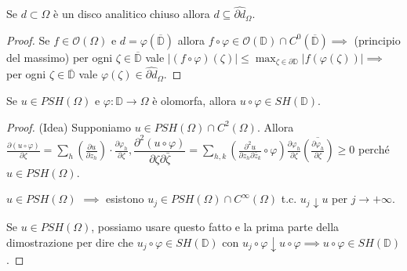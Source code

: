 \begin{lm}
  Se $d \subset \Omega$ è un disco analitico chiuso allora $d \subseteq \widehat{\partial d}_{\Omega}$.
\end{lm}

\begin{proof}
  Se $f \in \mathcal{O}(\Omega)$ e $d=\varphi(\overline{\mathbb{D}})$ allora $f \circ \varphi \in \mathcal{O}(\mathbb{D}) \cap C^0(\overline{\mathbb{D}}) \implies$ (principio del massimo) per ogni $\zeta \in \overline{\mathbb{D}}$ vale $\displaystyle |(f\circ \varphi)(\zeta)| \le \max_{\zeta \in \partial\mathbb{D}} |f(\varphi(\zeta))| \implies$
  per ogni $\zeta \in \overline{\mathbb{D}}$ vale $\varphi(\zeta) \in \widehat{\partial d}_{\Omega}$.
\end{proof}

\begin{lm} \label{uphish}
  Se $u \in PSH(\Omega)$ e $\varphi:\mathbb{D} \longrightarrow \Omega$ è olomorfa, allora $u \circ \varphi \in SH(\mathbb{D})$.
\end{lm}

\begin{proof}
  (Idea) Supponiamo $u \in PSH(\Omega)\cap C^2(\Omega)$.
  Allora $\displaystyle \frac{\partial(u\circ\varphi)}{\partial\zeta}=\sum_h \left(\frac{\partial u}{\partial z_h}\right)\cdot\frac{\partial\varphi_h}{\partial\zeta}, \dfrac{\partial^2(u\circ\varphi)}{\partial\zeta\partial\bar{\zeta}}=\sum_{h,k} \left(\frac{\partial^2 u}{\partial z_h\partial\bar{z}_k}\circ\varphi\right)\frac{\partial\varphi_h}{\partial\zeta}\overline{\left(\frac{\partial\varphi_h}{\partial\zeta}\right)} \ge 0$ perché $u \in PSH(\Omega)$.
  \begin{ftt}
    $u \in PSH(\Omega)$ $\implies$ esistono $u_j \in PSH(\Omega) \cap C^{\infty}(\Omega)$ t.c. $u_j \downarrow u$ per $j \longrightarrow+\infty$.
  \end{ftt}

  Se $u \in PSH(\Omega)$, possiamo usare questo fatto e la prima parte della dimostrazione per dire che $u_j \circ \varphi \in SH(\mathbb{D})$ con $u_j \circ \varphi \downarrow u \circ \varphi \implies u \circ \varphi \in SH(\mathbb{D})$.
\end{proof}

